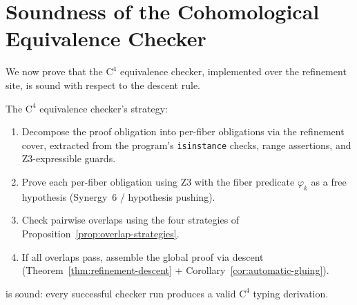 \section{Soundness of the Cohomological Equivalence Checker}
\label{sec:checker-soundness}

We now prove that the $\mathrm{C}^4$ equivalence checker, implemented over
the refinement site, is sound with respect to the descent rule.

\begin{theorem}
\label{thm:checker-soundness-ref}
The $\mathrm{C}^4$ equivalence checker's strategy:
\begin{enumerate}
\item Decompose the proof obligation into per-fiber obligations via the
  refinement cover, extracted from the program's \texttt{isinstance}
  checks, range assertions, and Z3-expressible guards.
\item Prove each per-fiber obligation using Z3 with the fiber predicate
  $\varphi_k$ as a free hypothesis (Synergy~6 / hypothesis pushing).
\item Check pairwise overlaps using the four strategies of
  Proposition~\ref{prop:overlap-strategies}.
\item If all overlaps pass, assemble the global proof via descent
  (Theorem~\ref{thm:refinement-descent} + Corollary~\ref{cor:automatic-gluing}).
\end{enumerate}
is sound: every successful checker run produces a valid $\mathrm{C}^4$
typing derivation.
\end{theorem}

